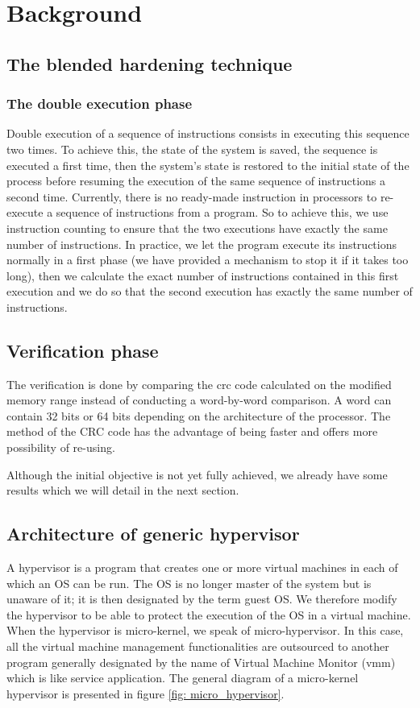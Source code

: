 \addchapheadtotoc
\chapter{Background}
\section{The blended hardening technique}
\subsection{The double execution phase}
Double execution of a sequence of instructions consists in executing this sequence two times. To achieve this, the state of the system is saved, the sequence is executed a first time, then the system's state is restored to the initial state of the process before resuming the execution of the same sequence of instructions a second time. Currently, there is no ready-made instruction in processors to re-execute a sequence of instructions from a \cite{intel_corporation_intel_2011} program. So to achieve this, we use instruction counting to ensure that the two executions have exactly the same number of instructions. In practice, we let the program execute its instructions normally in a first phase (we have provided a mechanism to stop it if it takes too long), then we calculate the exact number of instructions contained in this first execution and we do so that the second execution has exactly the same number of instructions.

\section{Verification phase}
The verification is done by comparing the \acrshort {crc} code calculated on the modified memory range instead of conducting a word-by-word comparison. A word can contain 32 bits or 64 bits depending on the architecture of the processor. The method of the CRC code has the advantage of being faster and offers more possibility of re-using.

Although the initial objective is not yet fully achieved, we already have some results which we will detail in the next section.

\section{Architecture of generic hypervisor}
A hypervisor is a program that creates one or more virtual machines in each of which an OS can be run. The OS is no longer master of the system but is unaware of it; it is then designated by the term guest OS. We therefore modify the hypervisor to be able to protect the execution of the OS in a virtual machine. When the hypervisor is micro-kernel, we speak of micro-hypervisor. In this case, all the virtual machine management functionalities are outsourced to another program generally designated by the name of Virtual Machine Monitor (\acrshort{vmm}) which is like service application. The general diagram of a micro-kernel hypervisor is presented in figure \ref{fig: micro_hypervisor}.

